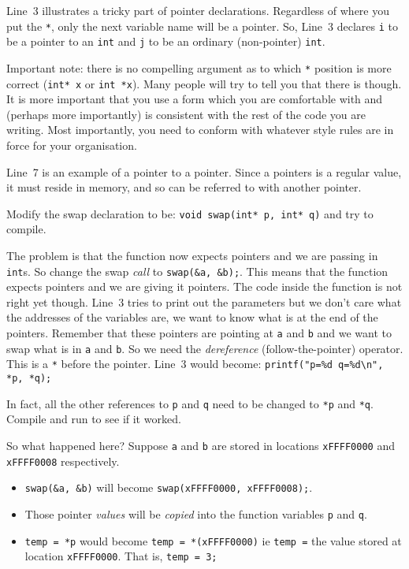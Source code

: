 Line~3 illustrates a tricky part of pointer declarations.
Regardless of where you put the \texttt{*}, only the next variable name will be a pointer.
So, Line~3 declares \texttt{i} to be a pointer to an \texttt{int} and \texttt{j} to be an ordinary (non-pointer) \texttt{int}.

Important note:
there is no compelling argument as to which \texttt{*} position is more correct (\texttt{int* x} or \texttt{int *x}).
Many people will try to tell you that there is though.
It is more important that you use a form which you are comfortable with and (perhaps more importantly) is consistent with 
the rest of the code you are writing.
Most importantly, you need to conform with whatever style rules are in force for your organisation.

Line~7 is an example of a pointer to a pointer.
Since a pointers is a regular value, it must reside in memory, and so can be referred to with another pointer.

Modify the swap declaration to be:
\lstinline!void swap(int* p, int* q)!
and try to compile.

The problem is that the function now expects pointers and we are passing in \texttt{int}s.
So change the swap \emph{call} to \lstinline!swap(&a, &b);!.
This means that the function expects pointers and we are giving it pointers.
The code inside the function is not right yet though.
Line~3 tries to print out the parameters but we don't care what the addresses of the variables are, we want to know what is
at the end of the pointers.
Remember that these pointers are pointing at \texttt{a} and \texttt{b} and we want to swap what is in \texttt{a} and \texttt{b}.
So we need the \emph{dereference} (follow-the-pointer) operator.
This is a \texttt{*} before the pointer.
Line~3 would become:
\lstinline!printf("p=%d q=%d\n", *p, *q);!

In fact, all the other references to \texttt{p} and \texttt{q} need to be changed to \texttt{*p} and \texttt{*q}.
Compile and run to see if it worked.

So what happened here?
Suppose \texttt{a} and \texttt{b} are stored in locations \lstinline{xFFFF0000} and \lstinline{xFFFF0008} respectively.
\begin{itemize}
 \item \lstinline{swap(&a, &b)} will become \lstinline{swap(xFFFF0000, xFFFF0008);}.
 \item Those pointer \emph{values} will be \emph{copied} into the function variables \texttt{p} and \texttt{q}.
 \item \lstinline!temp = *p! would become \lstinline!temp = *(xFFFF0000)! ie \texttt{temp =} the value stored at location 
 \lstinline!xFFFF0000!.  That is, \lstinline!temp = 3;!
\end{itemize}

